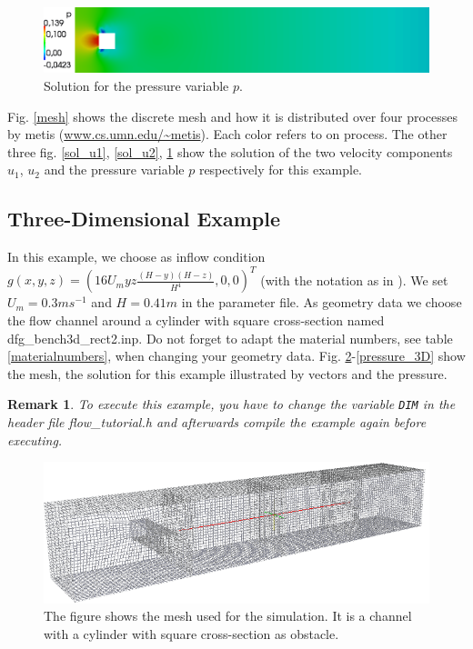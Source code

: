 \documentclass[a4paper, 11pt, twoside]{article}
\newtheorem{remark}{Remark}[section]
\begin{document}
\begin{figure}[h!]
	\centering
		\includegraphics[width=1.1\textwidth]{fig/p_pressure_flow_tutorial_trans.png}
\caption{Solution for the pressure variable $p$.}
\label{sol_p}
\end{figure}

Fig. \ref{mesh} shows the discrete mesh and how it is distributed over four processes by metis (\url{www.cs.umn.edu/~metis}). Each color refers to on process.
The other three fig. \ref{sol_u1}, \ref{sol_u2}, \ref{sol_p} show the solution of the two velocity components $u_1$, $u_2$ and the pressure variable $p$ respectively for this example. 

\subsection{Three-Dimensional Example}\label{section3D}
In this example, we choose as inflow condition $g(x,y,z) = (16 U_m y z\frac{(H-y)(H-z)}{H^4}, 0, 0)^T$ (with the notation as in \cite{Turek96recentbenchmark}). We set $U_m = 0.3 ms^{-1}$ and $H=0.41m$ in the parameter file. As geometry data we choose the flow channel around a cylinder with square cross-section named dfg\_bench3d\_rect2.inp. Do not forget to adapt the material numbers, see table \ref{materialnumbers}, when changing your geometry data. Fig. \ref{mesh_3D}-\ref{pressure_3D} show the mesh, the solution for this example illustrated by vectors and the
pressure. 

\begin{remark}
To execute this example, you have to change the variable \verb'DIM' in the header file flow\_tutorial.h and afterwards compile the example again before executing.
\end{remark}

\begin{figure}[h!]
	\centering
		\includegraphics[width=1.1\textwidth]{fig/FlowtutGitter2trans.png}
\caption{The figure shows the mesh used for the simulation. It is a channel with a cylinder with square cross-section as obstacle.}
\label{mesh_3D}
\end{figure}
\end{document}
